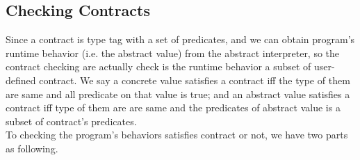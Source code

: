 \documentclass[paper=a4, fontsize=11pt]{scrartcl} %
\numberwithin{equation}{section} %
\numberwithin{figure}{section} %
\numberwithin{table}{section} %
\begin{document}


\subsection{Checking Contracts}
Since a contract is type tag with a set of predicates, and we can obtain program's runtime behavior (i.e. the abstract value) from the abstract interpreter, so the contract checking are actually check is the runtime behavior a subset of user-defined contract. We say a concrete value satisfies a contract iff the type of them are same and all predicate on that value is true; and an abstract value satisfies a contract iff type of them are are same and the predicates of abstract value is a subset of contract's predicates. \\

To checking the program's behaviors satisfies contract or not, we have two parts as following.
\end{document}
